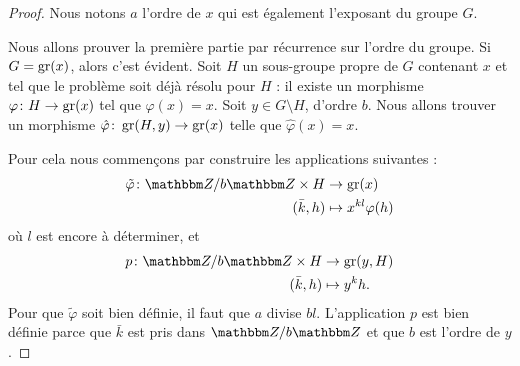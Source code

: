 \begin{proof}
    Nous notons \( a\) l'ordre de \( x\) qui est également l'exposant du groupe \( G\).

    Nous allons prouver la première partie par récurrence sur l'ordre du groupe. Si \( G=\operatorname{gr}(x)\), alors c'est évident. Soit \( H\) un sous-groupe propre de \( G\) contenant \( x\) et tel que le problème soit déjà résolu pour \( H\) : il existe un morphisme \( \varphi\colon H\to \operatorname{gr}(x)\) tel que \( \varphi(x)=x\). Soit \( y\in G\setminus H\), d'ordre \( b\). Nous allons trouver un morphisme $\hat\varphi\colon \operatorname{gr}(H,y)\to \operatorname{gr}(x) $ telle que \( \hat\varphi(x)=x\).

    Pour cela nous commençons par construire les applications suivantes :
    \begin{equation}
        \begin{aligned}
            \tilde \varphi\colon \eZ/b\eZ\times H&\to \gr(x) \\
            (\bar k,h)&\mapsto x^{kl}\varphi(h)
        \end{aligned}
    \end{equation}
    où \( l\) est encore à déterminer, et
    \begin{equation}
        \begin{aligned}
            p\colon \eZ/b\eZ\times H&\to \gr(y,H) \\
            (\bar k,h)&\mapsto y^kh.
        \end{aligned}
    \end{equation}
    Pour que \( \tilde \varphi\) soit bien définie, il faut que \( a\) divise \( bl\). L'application \( p\) est bien définie parce que \( \bar k\) est pris dans \( \eZ/b\eZ\) et que \( b\) est l'ordre de \( y\).


\end{proof}

